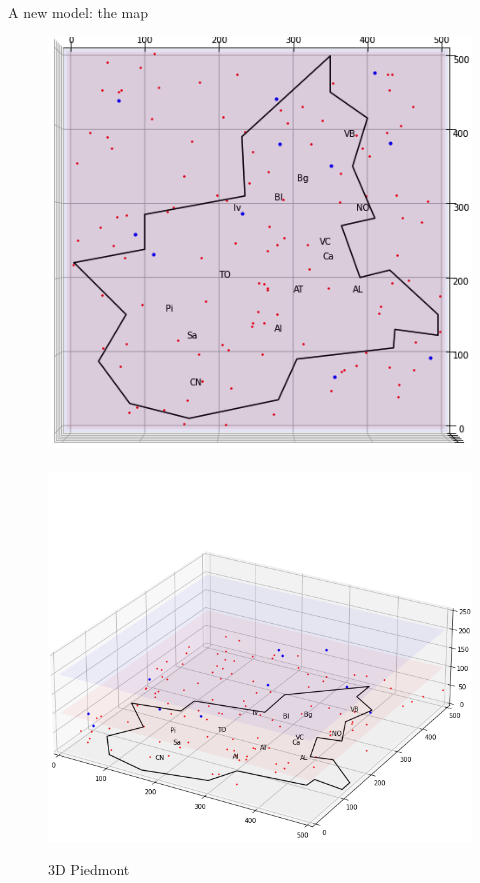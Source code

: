 \documentclass[8pt]{beamer}
\begin{document}
\begin{frame}{A new model: the map}

\begin{figure}[H]
\center
\includegraphics[scale=0.25]{Piem1.png}~~~~~~~~~\includegraphics[scale=0.25]{Piem2.png} 

\caption{3D Piedmont} 
\label{Piem}
\end{figure}

\end{frame}
\end{document}
